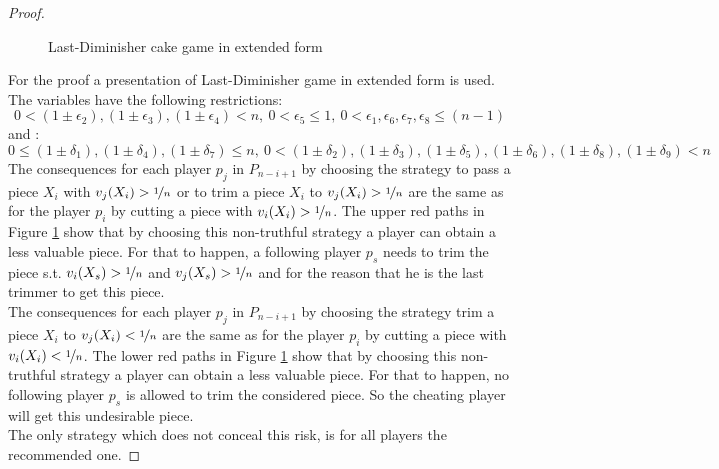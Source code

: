 \begin{proof}
\begin{figure}[h!]
\begin{center}
\begin{tikzpicture}
	\end{tikzpicture}
	\caption{Last-Diminisher cake game in extended form}\label{ldef}
\end{center}
\end{figure}
\newpage 
For the proof a presentation of Last-Diminisher game in extended form is used. The variables have the following restrictions: $$ 0 < (1\pm\epsilon_2),(1\pm\epsilon_3),(1\pm\epsilon_4) <n,\: 0 < \epsilon_5 \leq 1,\:0 < \epsilon_1,\epsilon_6,\epsilon_7,\epsilon_8 \leq (n-1)$$ and :$$ 0 \leq (1\pm\delta_1),(1\pm\delta_4),(1\pm\delta_7) \leq n,\:0< (1\pm\delta_2),(1\pm\delta_3),(1\pm\delta_5),(1\pm\delta_6),(1\pm\delta_8),(1\pm\delta_9) < n$$
The consequences for each player $p_j$ in $P_{n-i+1}$ by choosing the strategy to pass a piece $X_i$ with $v_j(X_i)>\nicefrac{1}{n}$ or to trim a piece $X_i$ to $v_j(X_i)>\nicefrac{1}{n}$ are the same as for the player $p_i$ by cutting a piece with $v_i(X_i)>\nicefrac{1}{n}$.
The upper red paths in Figure \ref{ldef} show that by choosing this non-truthful strategy a player can obtain a less valuable piece. For that to happen, a following player $p_s$ needs to trim the piece s.t. $v_i(X_s)>\nicefrac{1}{n}$ and $v_j(X_s)>\nicefrac{1}{n}$ and for the reason that he is the last trimmer to get this piece.\\
\newline
The consequences for each player $p_j$ in $P_{n-i+1}$ by choosing the strategy trim a piece $X_i$ to $v_j(X_i)<\nicefrac{1}{n}$ are the same as for the player $p_i$ by cutting a piece with $v_i(X_i)<\nicefrac{1}{n}$. The lower red paths in Figure \ref{ldef} show that by choosing this non-truthful strategy a player can obtain a less valuable piece. For that to happen, no following player $p_s$ is allowed to trim the considered piece. So the cheating player will get this undesirable piece.
\\
\newline
The only strategy which does not conceal this risk, is for all players the recommended one.
\end{proof}
